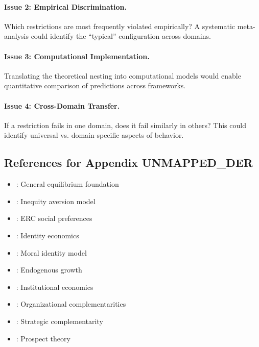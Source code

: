 \paragraph{Issue 2: Empirical Discrimination.}
Which restrictions are most frequently violated empirically? A systematic
meta-analysis could identify the ``typical'' configuration across domains.

\paragraph{Issue 3: Computational Implementation.}
Translating the theoretical nesting into computational models would enable
quantitative comparison of predictions across frameworks.

\paragraph{Issue 4: Cross-Domain Transfer.}
If a restriction fails in one domain, does it fail similarly in others?
This could identify universal vs. domain-specific aspects of behavior.


\subsection{References for Appendix UNMAPPED_DER}
\label{sec:A-references}

\begin{itemize}[nosep]
    \item \citet{arrowdeb}: General equilibrium foundation
    \item \citet{fehrschmidt}: Inequity aversion model
    \item \citet{boltonockenfels}: ERC social preferences
    \item \citet{akerlofkranton}: Identity economics
    \item \citet{benaboutirole}: Moral identity model
    \item \citet{aghionhowitt}: Endogenous growth
    \item \citet{acemoglu}: Institutional economics
    \item \citet{roberts2004}: Organizational complementarities
    \item \citet{milgromroberts1990}: Strategic complementarity
    \item \citet{kahnemantversky1979}: Prospect theory
\end{itemize}

